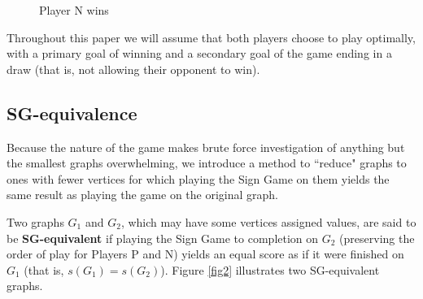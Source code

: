 \documentclass[amsart,11pt]{article}
\theoremstyle{dotless}
\theoremstyle{dotless}
\begin{document}
\begin{figure}[htb]
\centering
{}
\caption{Player N wins}
 \label{fig1}
\end{figure}

Throughout this paper we will assume that both players choose to play optimally, with a primary goal of winning and a secondary goal of the game ending in a draw (that is, not allowing their opponent to win). 

\subsection{SG-equivalence}

 Because the nature of the game makes brute force investigation of anything but the smallest graphs overwhelming, we introduce a method to ``reduce" graphs to ones with fewer vertices for which playing the Sign Game on them yields the same result as playing the game on the original graph.

Two graphs $G_1$ and $G_2$, which may have some vertices assigned values, are said to be \textbf{SG-equivalent} if playing the Sign Game to completion on $G_2$ (preserving the order of play for Players P and N) yields an equal score as if it were finished on $G_1$ (that is, $s(G_1) = s(G_2)$). Figure \ref{fig2} illustrates two SG-equivalent graphs.
\end{document}

